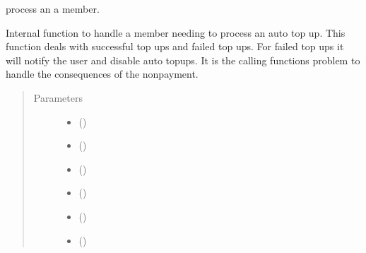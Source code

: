 \documentclass[letterpaper,10pt,english]{sphinxmanual}
\begin{document}
\begin{fulllineitems}
\label{\detokenize{payments:payments.core.auto_topup_member}}
process an a member.

Internal function to handle a member needing to process an auto top up.
This function deals with successful top ups and failed top ups. For
failed top ups it will notify the user and disable auto topups. It is
the calling functions problem to handle the consequences of the non\sphinxhyphen{}payment.
\begin{quote}\begin{description}
\item[{Parameters}] \leavevmode\begin{itemize}
\item {} 
 () \textendash{} 

\item {} 
 () \textendash{} 

\item {} 
\sphinxstyleliteralstrong{\sphinxupquote{,}} () \textendash{} 

\item {} 
\sphinxstyleliteralstrong{\sphinxupquote{, }} () \textendash{} 

\item {} 
 () \textendash{} 

\item {} 
 () \textendash{} 


\end{itemize}
\end{description}
\end{quote}
\end{fulllineitems}
\end{document}
